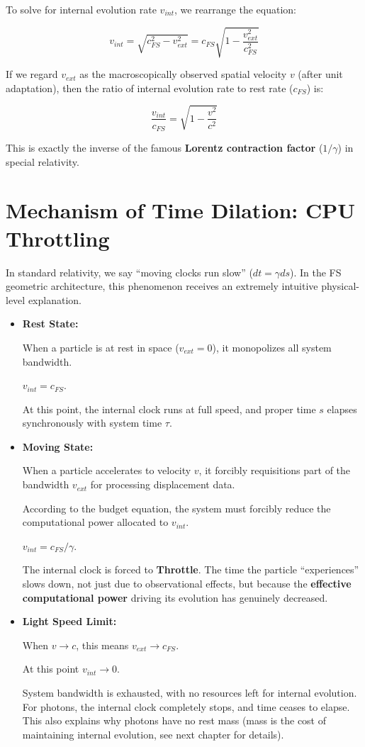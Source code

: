 \documentclass[11pt,a4paper,twoside]{book}
\begin{document}
To solve for internal evolution rate \textbf{$v_{int}$}, we rearrange the equation:

$$v_{int} = \sqrt{c_{FS}^2 - v_{ext}^2} = c_{FS} \sqrt{1 - \frac{v_{ext}^2}{c_{FS}^2}}$$

If we regard \textbf{$v_{ext}$} as the macroscopically observed spatial velocity \textbf{$v$} (after unit adaptation), then the ratio of internal evolution rate to rest rate (\textbf{$c_{FS}$}) is:

$$\frac{v_{int}}{c_{FS}} = \sqrt{1 - \frac{v^2}{c^2}}$$

This is exactly the inverse of the famous \textbf{Lorentz contraction factor} (\textbf{$1/\gamma$}) in special relativity.

\section{Mechanism of Time Dilation: CPU Throttling}

In standard relativity, we say ``moving clocks run slow'' (\textbf{$dt = \gamma ds$}). In the FS geometric architecture, this phenomenon receives an extremely intuitive physical-level explanation.

\begin{itemize}
\item \textbf{Rest State:}

    When a particle is at rest in space (\textbf{$v_{ext} = 0$}), it monopolizes all system bandwidth.

    \textbf{$v_{int} = c_{FS}$}.

    At this point, the internal clock runs at full speed, and proper time \textbf{$s$} elapses synchronously with system time \textbf{$\tau$}.

\item \textbf{Moving State:}

    When a particle accelerates to velocity \textbf{$v$}, it forcibly requisitions part of the bandwidth \textbf{$v_{ext}$} for processing displacement data.

    According to the budget equation, the system must forcibly reduce the computational power allocated to \textbf{$v_{int}$}.

    \textbf{$v_{int} = c_{FS} / \gamma$}.

    The internal clock is forced to \textbf{Throttle}. The time the particle ``experiences'' slows down, not just due to observational effects, but because the \textbf{effective computational power} driving its evolution has genuinely decreased.

\item \textbf{Light Speed Limit:}

    When \textbf{$v \to c$}, this means \textbf{$v_{ext} \to c_{FS}$}.

    At this point \textbf{$v_{int} \to 0$}.

    System bandwidth is exhausted, with no resources left for internal evolution. For photons, the internal clock completely stops, and time ceases to elapse. This also explains why photons have no rest mass (mass is the cost of maintaining internal evolution, see next chapter for details).
\end{itemize}
\end{document}
